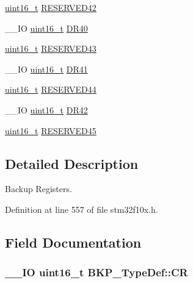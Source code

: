 \begin{DoxyCompactItemize}
\item 
\hyperlink{stdint_8h_a273cf69d639a59973b6019625df33e30}{uint16\-\_\-t} \hyperlink{struct_b_k_p___type_def_a6c6fdbc4e9c4da805e346636cc2ef0c2}{R\-E\-S\-E\-R\-V\-E\-D42}
\item 
\-\_\-\-\_\-\-I\-O \hyperlink{stdint_8h_a273cf69d639a59973b6019625df33e30}{uint16\-\_\-t} \hyperlink{struct_b_k_p___type_def_a1811cf03bde48bc9becc8795d3e09d7f}{D\-R40}
\item 
\hyperlink{stdint_8h_a273cf69d639a59973b6019625df33e30}{uint16\-\_\-t} \hyperlink{struct_b_k_p___type_def_ab83c42a1464c23dc1ed953a7eb5dc42a}{R\-E\-S\-E\-R\-V\-E\-D43}
\item 
\-\_\-\-\_\-\-I\-O \hyperlink{stdint_8h_a273cf69d639a59973b6019625df33e30}{uint16\-\_\-t} \hyperlink{struct_b_k_p___type_def_a9e9b72b388e2ed718df333cfb9e90226}{D\-R41}
\item 
\hyperlink{stdint_8h_a273cf69d639a59973b6019625df33e30}{uint16\-\_\-t} \hyperlink{struct_b_k_p___type_def_ace6f58bc4fe4083665e1512dfc6018c2}{R\-E\-S\-E\-R\-V\-E\-D44}
\item 
\-\_\-\-\_\-\-I\-O \hyperlink{stdint_8h_a273cf69d639a59973b6019625df33e30}{uint16\-\_\-t} \hyperlink{struct_b_k_p___type_def_af7a01e3a3e1be76ebb8100e7ff6de9c0}{D\-R42}
\item 
\hyperlink{stdint_8h_a273cf69d639a59973b6019625df33e30}{uint16\-\_\-t} \hyperlink{struct_b_k_p___type_def_affa0a45a3aaa83ef2949761b44ad4283}{R\-E\-S\-E\-R\-V\-E\-D45}
\end{DoxyCompactItemize}


\subsection{Detailed Description}
Backup Registers. 

Definition at line 557 of file stm32f10x.\-h.



\subsection{Field Documentation}
\hypertarget{struct_b_k_p___type_def_adbf9c928b534b4a017429de248982284}{
\subsubsection[{C\-R}]{\setlength{\rightskip}{0pt plus 5cm}\-\_\-\-\_\-\-I\-O {\bf uint16\-\_\-t} B\-K\-P\-\_\-\-Type\-Def\-::\-C\-R}}\label{struct_b_k_p___type_def_adbf9c928b534b4a017429de248982284}


